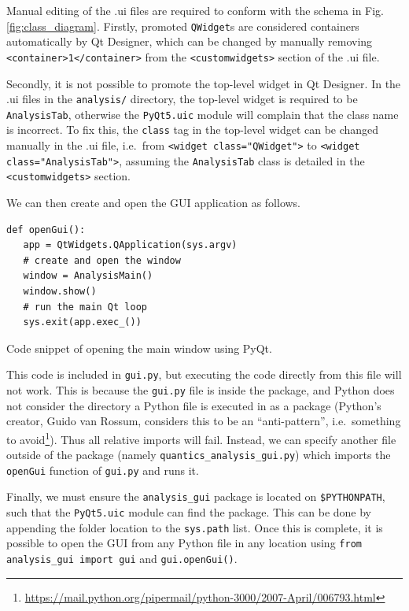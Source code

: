\documentclass[12pt]{article}
\newenvironment{code}{\captionsetup{type=listing}}{\par\addvspace{\baselineskip}}
\begin{document}
Manual editing of the .ui files are required to conform with the schema in Fig. \ref{fig:class_diagram}. Firstly, promoted \texttt{QWidget}s are considered containers automatically by Qt Designer, which can be changed by manually removing \texttt{<container>1</container>} from the \texttt{<customwidgets>} section of the .ui file.

Secondly, it is not possible to promote the top-level widget in Qt Designer. In the .ui files in the \texttt{analysis/} directory, the top-level widget is required to be \texttt{AnalysisTab}, otherwise the \texttt{PyQt5.uic} module will complain that the class name is incorrect. To fix this, the \texttt{class} tag in the top-level widget can be changed manually in the .ui file, i.e.~from \texttt{<widget class="QWidget">} to \texttt{<widget class="AnalysisTab">}, assuming the \texttt{AnalysisTab} class is detailed in the \texttt{<customwidgets>} section.

We can then create and open the GUI application as follows.
\pagebreak
\begin{code}\begin{verbatim}
def openGui():
   app = QtWidgets.QApplication(sys.argv)
   # create and open the window
   window = AnalysisMain()
   window.show()
   # run the main Qt loop
   sys.exit(app.exec_())
\end{verbatim}
\caption{Code snippet of opening the main window using PyQt.}
\label{lst:open_gui}
\end{code}

This code is included in \texttt{gui.py}, but executing the code directly from this file will not work. This is because the \texttt{gui.py} file is inside the package, and Python does not consider the directory a Python file is executed in as a package (Python's creator, Guido van Rossum, considers this to be an ``anti-pattern'', i.e.~something to avoid\footnote{\url{https://mail.python.org/pipermail/python-3000/2007-April/006793.html}}). Thus all relative imports will fail. Instead, we can specify another file outside of the package (namely \texttt{quantics\_analysis\_gui.py}) which imports the \texttt{openGui} function of \texttt{gui.py} and runs it.

Finally, we must ensure the \texttt{analysis\_gui} package is located on \texttt{\$PYTHONPATH}, such that the \texttt{PyQt5.uic} module can find the package. This can be done by appending the folder location to the \texttt{sys.path} list. Once this is complete, it is possible to open the GUI from any Python file in any location using \texttt{from analysis_gui import gui} and \texttt{gui.openGui()}.
\end{document}
